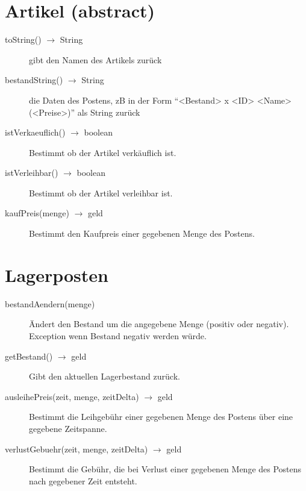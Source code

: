 \documentclass[a4paper,12pt,titlepage]{article}
\begin{document}
\section{Artikel (abstract)}
\begin{description}
\item[toString() $\rightarrow$ String]
gibt den Namen des Artikels zurück
\item[bestandString() $\rightarrow$ String]
die Daten des Postens, zB in der Form \enquote{<Bestand> x <ID> <Name> (<Preise>)} als String zurück
\item[istVerkaeuflich() $\rightarrow$ boolean]
Bestimmt ob der Artikel verkäuflich ist.
\item[istVerleihbar() $\rightarrow$ boolean]
Bestimmt ob der Artikel verleihbar ist.
\item[kaufPreis(menge) $\rightarrow$ geld]
Bestimmt den Kaufpreis einer gegebenen Menge des Postens.
\end{description}
\section{Lagerposten}
\begin{description}
\item[bestandAendern(menge)]
Ändert den Bestand um die angegebene Menge (positiv oder negativ). \\
Exception wenn Bestand negativ werden würde.
\item[getBestand() $\rightarrow$ geld]
Gibt den aktuellen Lagerbestand zurück.
\item[ausleihePreis(zeit, menge, zeitDelta) $\rightarrow$ geld]
Bestimmt die Leihgebühr einer gegebenen Menge des Postens über eine gegebene Zeitspanne.
\item[verlustGebuehr(zeit, menge, zeitDelta) $\rightarrow$ geld]
Bestimmt die Gebühr, die bei Verlust einer gegebenen Menge des Postens nach gegebener Zeit entsteht.

\end{description}
\end{document}
